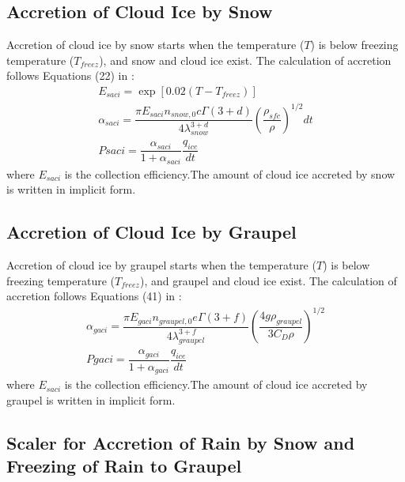 \documentclass[letterpaper,titlepage,10pt]{article}
\numberwithin{equation}{section}
\begin{document}
\subsection{Accretion of Cloud Ice by Snow}

Accretion of cloud ice by snow starts when the temperature ($T$) is below freezing temperature ($T_{freez}$), and snow and cloud ice exist. The calculation of accretion follows Equations (22) in \citet{lin1983bulk}:
\begin{gather}
	E_{saci} = \exp \left[0.02 \left(T - T_{freez} \right) \right] \\
	\alpha_{saci} = \dfrac{\pi E_{saci} n_{snow,0} c \Gamma \left(3 + d \right)}{4 \lambda^{3+d}_{snow}} \left(\dfrac{\rho_{sfc}}{\rho} \right)^{1/2} dt \\
	Psaci = \dfrac{\alpha_{saci}}{1 + \alpha_{saci}} \dfrac{q_{ice}}{dt}
\end{gather}
where $E_{saci}$ is the collection efficiency.The amount of cloud ice accreted by snow is written in implicit form.


\subsection{Accretion of Cloud Ice by Graupel}

Accretion of cloud ice by graupel starts when the temperature ($T$) is below freezing temperature ($T_{freez}$), and graupel and cloud ice exist. The calculation of accretion follows Equations (41) in \citet{lin1983bulk}:
\begin{gather}
	\alpha_{gaci} = \dfrac{\pi E_{gaci} n_{graupel,0} e \Gamma \left(3 + f \right)}{4 \lambda^{3 + f}_{graupel}} \left(\dfrac{4 g \rho_{graupel}}{3 C_D \rho} \right)^{1/2} \\
	Pgaci = \dfrac{\alpha_{gaci}}{1 + \alpha_{gaci}} \dfrac{q_{ice}}{dt}
\end{gather}
where $E_{saci}$ is the collection efficiency.The amount of cloud ice accreted by graupel is written in implicit form.


\subsection{Scaler for Accretion of Rain by Snow and Freezing of Rain to Graupel}
\end{document}
